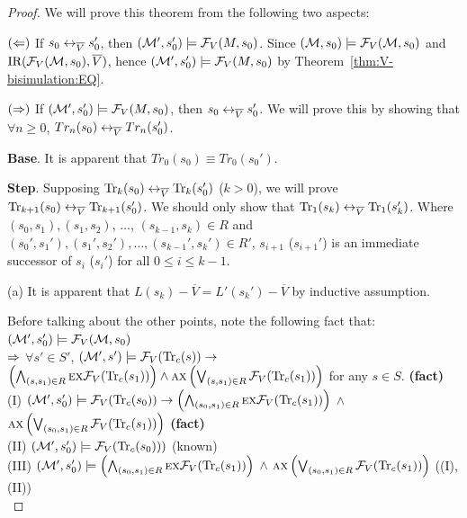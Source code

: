 \documentclass{article}
\begin{document}
\begin{proof}
We will prove this theorem from the following two aspects:

$(\Leftarrow)$ If $s_0 \leftrightarrow_{\overline V} s_0'$, then $({\cal M}',s_0') \models {\cal F}_V(M,s_0)$. Since $({\cal M}, s_0) \models {\cal F}_V({\cal M}, s_0)$ and $\textrm{IR}({\cal F}_V({\cal M}, s_0), \overline V)$, hence
$({\cal M}',s_0') \models {\cal F}_V(M,s_0)$ by Theorem~\ref{thm:V-bisimulation:EQ}.

$(\Rightarrow)$ If $({\cal M}',s_0') \models {\cal F}_V(M,s_0)$, then $s_0 \leftrightarrow_{\overline V} s_0'$. We will prove this by showing that $\forall n \geq 0$, $Tr_n(s_0) \leftrightarrow_{\overline V} Tr_n(s_0')$.


\textbf{Base}. It is apparent that $Tr_0(s_0) \equiv Tr_0(s_0')$.

\textbf{Step}. Supposing $\textrm{Tr}_k(s_0) \leftrightarrow_{\overline V} \textrm{Tr}_k(s_0')$ ($k > 0$), we will prove $\textrm{Tr}_{k+1}(s_0) \leftrightarrow_{\overline V} \textrm{Tr}_{k+1}(s_0')$. We should only show that $\textrm{Tr}_1(s_k) \leftrightarrow_{\overline V} \textrm{Tr}_1(s_k')$. Where $(s_0, s_1), (s_1, s_2)$, $\dots$, $(s_{k-1}, s_k) \in R$ and $(s_0', s_1'), (s_1', s_2'), \dots, (s_{k-1}', s_k') \in R'$, \ie $s_{i+1}$ ($s_{i+1}'$) is an immediate successor of $s_i$ ($s_i'$) for all $0 \leq i \leq k-1$.

      (a) It is apparent that $L(s_k) - \overline V = L'(s_k') - \overline V$ by inductive assumption.

      Before talking about the other points, note the following fact that:\\
      $({\cal M}',s_0') \models {\cal F}_V({\cal M},s_0)$\\
      $\Rightarrow$ $\forall s'\in S'$, $({\cal M}', s')\models {\cal F}_V(\textrm{Tr}_c(s)) \rightarrow$ \\ $\left(\bigwedge_{(s,s_1)\in R} \textsc{e} \textsc{x} {\cal F}_V(\textrm{Tr}_c(s_1))\right)\wedge \textsc{a} \textsc{x} \left( \bigvee_{(s,s_1)\in R} {\cal F}_V(\textrm{Tr}_c(s_1))\right)$  for any $s\in S$.   \hfill  \textbf{(fact)}\\
      (I) $({\cal M}', s_0') \models {\cal F}_V(\textrm{Tr}_c(s_0)) \rightarrow \left(\bigwedge_{(s_0, s_1) \in R} \textsc{e} \textsc{x} {\cal F}_V(\textrm{Tr}_c(s_1))\right)$ $\wedge$ $\textsc{a} \textsc{x} \left(\bigvee_{(s_0, s_1) \in R} {\cal F}_V(\textrm{Tr}_c(s_1)) \right)$     \hfill  \textbf{(fact)}\\
        (II) $({\cal M}', s_0') \models {\cal F}_V(\textrm{Tr}_c(s_0)))$  \hfill  (known)\\
        (III) $({\cal M}', s_0') \models \left(\bigwedge_{(s_0, s_1) \in R} \textsc{e} \textsc{x} {\cal F}_V(\textrm{Tr}_c(s_1))\right)$ $\wedge$ $\textsc{a} \textsc{x} \left(\bigvee_{(s_0, s_1) \in R} {\cal F}_V(\textrm{Tr}_c(s_1)) \right)$  \hfill  ((I),(II))\\


\end{proof}
\end{document}

